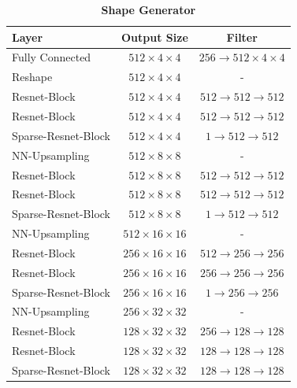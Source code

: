 \begin{table}[h]
\caption{\textbf{Shape Generator}} %
\centering %
\begin{tabular}{l c c}
\toprule
\textbf{Layer} & \textbf{Output Size} & \textbf{Filter} \\ \midrule
\small{Fully Connected} & \small{$512 \times 4 \times 4$} & \small{$256 \rightarrow 512 \times 4 \times 4$} \\
\small{Reshape} & \small{$512 \times 4 \times 4$} & - \\
\midrule
\small{Resnet-Block} & \small{$512 \times 4 \times 4$} & \small{$512 \rightarrow 512 \rightarrow 512$} \\
\small{Resnet-Block} & \small{$512 \times 4 \times 4$} & \small{$512 \rightarrow 512 \rightarrow 512$} \\
\small{Sparse-Resnet-Block} & \small{$512 \times 4 \times 4$} & \small{$1 \rightarrow 512 \rightarrow 512$} \\
\small{NN-Upsampling} & \small{$512 \times 8 \times 8$} & - \\
\midrule
\small{Resnet-Block} & \small{$512 \times 8 \times 8$} & \small{$512 \rightarrow 512 \rightarrow 512$} \\
\small{Resnet-Block} & \small{$512 \times 8 \times 8$} & \small{$512 \rightarrow 512 \rightarrow 512$} \\
\small{Sparse-Resnet-Block} & \small{$512 \times 8 \times 8$} & \small{$1 \rightarrow 512 \rightarrow 512$} \\
\small{NN-Upsampling} & \small{$512 \times 16 \times 16$} & - \\
\midrule
\small{Resnet-Block} & \small{$256 \times 16 \times 16$} & \small{$512 \rightarrow 256 \rightarrow 256$} \\
\small{Resnet-Block} & \small{$256 \times 16 \times 16$} & \small{$256 \rightarrow 256 \rightarrow 256$} \\
\small{Sparse-Resnet-Block} & \small{$256 \times 16 \times 16$} & \small{$1 \rightarrow 256 \rightarrow 256$} \\
\small{NN-Upsampling} & \small{$256 \times 32 \times 32$} & - \\
\midrule
\small{Resnet-Block} & \small{$128 \times 32 \times 32$} & \small{$256 \rightarrow 128 \rightarrow 128$} \\
\small{Resnet-Block} & \small{$128 \times 32 \times 32$} & \small{$128 \rightarrow 128 \rightarrow 128$} \\
\small{Sparse-Resnet-Block} & \small{$128 \times 32 \times 32$} & \small{$128 \rightarrow 128 \rightarrow 128$} \\

\end{tabular}
\end{table}
